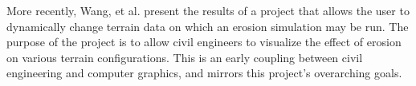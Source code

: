 More recently, Wang, et al. \cite{Wang-ErosionProtection} present the results of a project that allows the user to dynamically change terrain data on which an erosion simulation may be run. The purpose of the project is to allow civil engineers to visualize the effect of erosion on various terrain configurations. This is an early coupling between civil engineering and computer graphics, and mirrors this project's overarching goals.


% 
% 
% 
% 

